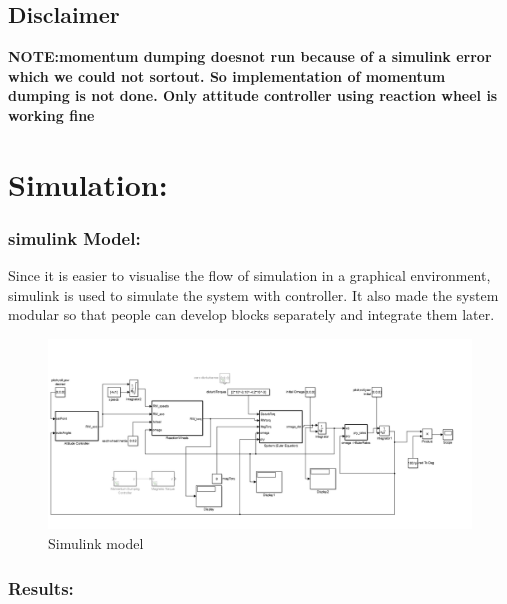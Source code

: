 \documentclass[10pt,a4paper]{report}
\begin{document}
\section{Disclaimer}
\textbf{NOTE:}\textbf{momentum dumping doesnot run because of a simulink error which we could not sortout. So implementation of momentum dumping is not done. Only attitude controller using reaction wheel is working fine}
\chapter{Simulation:}
\subsection{simulink Model:}
Since it is easier to visualise the flow of simulation in a graphical environment, simulink is used to simulate the system with controller.
It also made the system modular so that people can develop blocks separately and integrate them later.
\begin{figure}[H]
\centering
\includegraphics[scale=0.3]{Untitled1.png}
\caption{Simulink model}
\end{figure}
\subsection{Results:}
\end{document}
